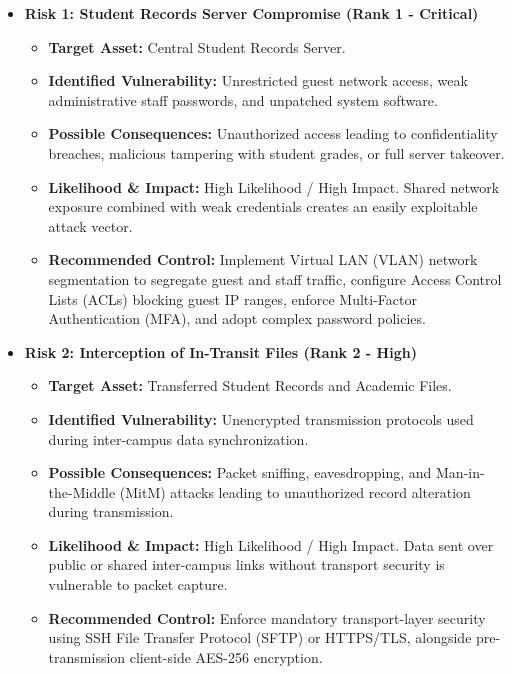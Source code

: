 \documentclass[12pt,a4paper]{article}
\begin{document}
\begin{itemize}[leftmargin=*, itemsep=0.2em]
    \item \textbf{Risk 1: Student Records Server Compromise (Rank 1 - Critical)}
    \begin{itemize}[label=$\circ$, leftmargin=1.5em]
        \item \textbf{Target Asset:} Central Student Records Server.
        \item \textbf{Identified Vulnerability:} Unrestricted guest network access, weak administrative staff passwords, and unpatched system software.
        \item \textbf{Possible Consequences:} Unauthorized access leading to confidentiality breaches, malicious tampering with student grades, or full server takeover.
        \item \textbf{Likelihood \& Impact:} High Likelihood / High Impact. Shared network exposure combined with weak credentials creates an easily exploitable attack vector.
        \item \textbf{Recommended Control:} Implement Virtual LAN (VLAN) network segmentation to segregate guest and staff traffic, configure Access Control Lists (ACLs) blocking guest IP ranges, enforce Multi-Factor Authentication (MFA), and adopt complex password policies.
    \end{itemize}

    \item \textbf{Risk 2: Interception of In-Transit Files (Rank 2 - High)}
    \begin{itemize}[label=$\circ$, leftmargin=1.5em]
        \item \textbf{Target Asset:} Transferred Student Records and Academic Files.
        \item \textbf{Identified Vulnerability:} Unencrypted transmission protocols used during inter-campus data synchronization.
        \item \textbf{Possible Consequences:} Packet sniffing, eavesdropping, and Man-in-the-Middle (MitM) attacks leading to unauthorized record alteration during transmission.
        \item \textbf{Likelihood \& Impact:} High Likelihood / High Impact. Data sent over public or shared inter-campus links without transport security is vulnerable to packet capture.
        \item \textbf{Recommended Control:} Enforce mandatory transport-layer security using SSH File Transfer Protocol (SFTP) or HTTPS/TLS, alongside pre-transmission client-side AES-256 encryption.
    \end{itemize}


\end{itemize}
\end{document}
